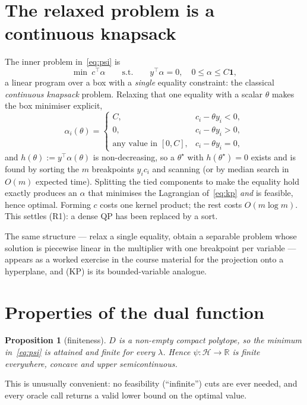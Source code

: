 \documentclass[11pt,a4paper]{report}
\newtheorem{proposition}{Proposition}[chapter]
\newcommand{\R}{\mathbb{R}}
\newcommand{\Hs}{\mathcal{H}}
\newcommand{\one}{\mathbf{1}}
\begin{document}
\section{The relaxed problem is a continuous knapsack}
\label{sec:knapsack}
The inner problem in~\eqref{eq:psi} is
\begin{equation}
\label{eq:kp}
\tag{KP}
\min\ c^{\!\top}\alpha \qquad\text{s.t.}\qquad y^{\!\top}\alpha=0,\quad 0\le\alpha\le C\one,
\end{equation}
a linear program over a box with a \emph{single} equality constraint: the classical
\emph{continuous knapsack} problem. Relaxing that one equality with a scalar $\theta$
makes the box minimiser explicit,
\[
\alpha_i(\theta)=\begin{cases}
C, & c_i-\theta y_i<0,\\
0, & c_i-\theta y_i>0,\\
\text{any value in }[0,C], & c_i-\theta y_i=0 ,
\end{cases}
\]
and $h(\theta):=y^{\!\top}\alpha(\theta)$ is non-decreasing, so a $\theta^\star$ with
$h(\theta^\star)=0$ exists and is found by sorting the $m$ breakpoints $y_ic_i$ and
scanning (or by median search in $O(m)$ expected time). Splitting the tied components
to make the equality hold exactly produces an $\alpha$ that minimises the Lagrangian
of~\eqref{eq:kp} \emph{and} is feasible, hence optimal. Forming $c$ costs one kernel
product; the rest costs $O(m\log m)$. This settles (R1): a dense QP has been replaced
by a sort.

The same structure --- relax a single equality, obtain a separable problem whose
solution is piecewise linear in the multiplier with one breakpoint per variable ---
appears as a worked exercise in the course material for the projection onto a
hyperplane, and (KP) is its bounded-variable analogue.

\section{Properties of the dual function}
\label{sec:psiprops}
\begin{proposition}[finiteness]
$D$ is a non-empty compact polytope, so the minimum in~\eqref{eq:psi} is attained and
finite for every $\lambda$. Hence $\psi:\Hs\to\R$ is finite everywhere, concave and
upper semicontinuous.
\end{proposition}
This is unusually convenient: no feasibility (``infinite'') cuts are ever needed, and
every oracle call returns a valid lower bound on the optimal value.
\end{document}
